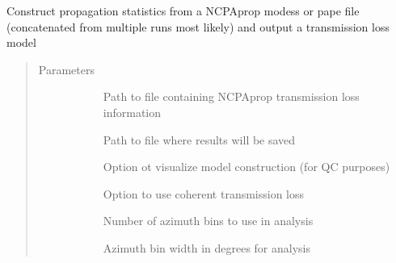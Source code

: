 \documentclass[letterpaper,10pt,english]{sphinxmanual}
\begin{document}
\begin{fulllineitems}
\begin{fulllineitems}
\label{\detokenize{stochprop.propagation:stochprop.propagation.TLossModel.build}}
\sphinxAtStartPar
Construct propagation statistics from a NCPAprop modess or pape file (concatenated from
multiple runs most likely) and output a transmission loss model
\begin{quote}\begin{description}
\item[{Parameters}] \leavevmode\begin{description}
\item[{}] \leavevmode
\sphinxAtStartPar
Path to file containing NCPAprop transmission loss information

\item[{}] \leavevmode
\sphinxAtStartPar
Path to file where results will be saved

\item[{}] \leavevmode
\sphinxAtStartPar
Option ot visualize model construction (for QC purposes)

\item[{}] \leavevmode
\sphinxAtStartPar
Option to use coherent transmission loss

\item[{}] \leavevmode
\sphinxAtStartPar
Number of azimuth bins to use in analysis

\item[{}] \leavevmode
\sphinxAtStartPar
Azimuth bin width in degrees for analysis

\end{description}

\end{description}\end{quote}


\end{fulllineitems}
\end{fulllineitems}
\end{document}

